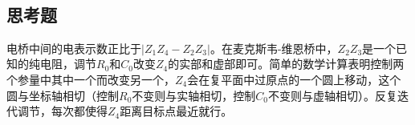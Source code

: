 \documentclass[UTF8]{ctexart}
\begin{document}
\begin{figure}[h]
  \centering
  \hfill
  \\
\end{figure}

\subsection{思考题}
电桥中间的电表示数正比于$|Z_1Z_4-Z_2Z_3|$。在麦克斯韦-维恩桥中，$Z_2Z_3$是一个已知的纯电阻，调节$R_0$和$C_0$改变$Z_4$的实部和虚部即可。简单的数学计算表明控制两个参量中其中一个而改变另一个，$Z_4$会在复平面中过原点的一个圆上移动，这个圆与坐标轴相切（控制$R_0$不变则与实轴相切，控制$C_0$不变则与虚轴相切）。反复迭代调节，每次都使得$Z_4$距离目标点最近就行。
\end{document}
